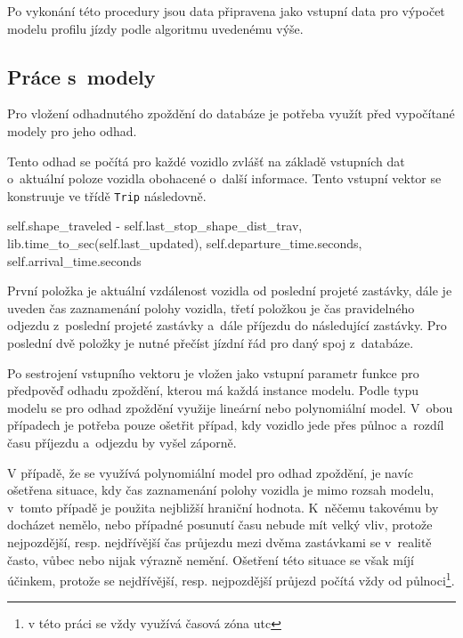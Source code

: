 \bigbreak


Po vykonání této procedury jsou data připravena jako vstupní data pro výpočet modelu profilu jízdy podle algoritmu uvedenému výše.


\subsection{Práce s~modely}


Pro vložení odhadnutého zpoždění do databáze je potřeba využít před vypočítané modely pro jeho odhad.


\bigbreak


Tento odhad se počítá pro každé vozidlo zvlášť na základě vstupních dat o~aktuální poloze vozidla obohacené o~další informace. Tento vstupní vektor se konstruuje ve třídě \verb-Trip- následovně.


\begin{code}[frame=none]
self.shape_traveled - self.last_stop_shape_dist_trav,
lib.time_to_sec(self.last_updated),
self.departure_time.seconds,
self.arrival_time.seconds
\end{code}


\bigbreak


První položka je aktuální vzdálenost vozidla od poslední projeté zastávky, dále je uveden čas zaznamenání polohy vozidla, třetí položkou je čas pravidelného odjezdu z~poslední projeté zastávky a~dále příjezdu do následující zastávky. Pro poslední dvě položky je nutné přečíst jízdní řád pro daný spoj z~databáze.


\bigbreak


Po sestrojení vstupního vektoru je vložen jako vstupní parametr funkce pro předpověď odhadu zpoždění, kterou má každá instance modelu. Podle typu modelu se pro odhad zpoždění využije lineární nebo polynomiální model. V~obou případech je potřeba pouze ošetřit případ, kdy vozidlo jede přes půlnoc a~rozdíl času příjezdu a~odjezdu by vyšel záporně.


\bigbreak


V případě, že se využívá polynomiální model pro odhad zpoždění, je navíc ošetřena situace, kdy čas zaznamenání polohy vozidla je mimo rozsah modelu, v~tomto případě je použita nejbližší hraniční hodnota. K~něčemu takovému by docházet nemělo, nebo případné posunutí času nebude mít velký vliv, protože nejpozdější, resp. nejdřívější čas průjezdu mezi dvěma zastávkami se v~realitě často, vůbec nebo nijak výrazně nemění. Ošetření této situace se však míjí účinkem, protože se nejdřívější, resp. nejpozdější průjezd počítá vždy od půlnoci\footnote{v této práci se vždy využívá časová zóna \gls{utc}}.


